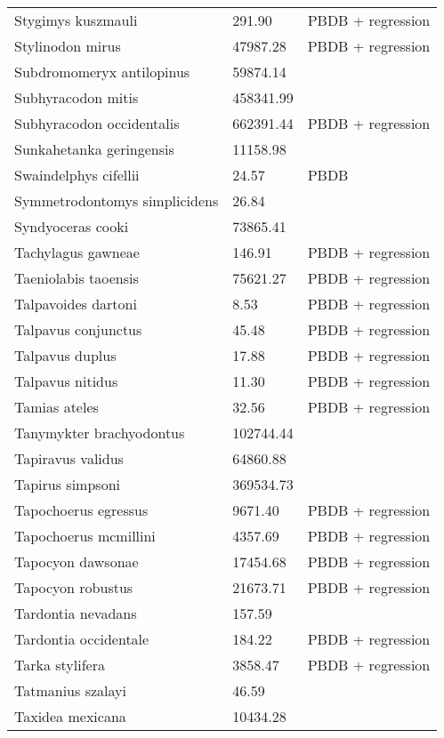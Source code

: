 \begin{center}
\begin{longtable}{p{} p{} p{} }
  Stygimys kuszmauli & 291.90 & PBDB + regression \\ 
  Stylinodon mirus & 47987.28 & PBDB + regression \\ 
  Subdromomeryx antilopinus & 59874.14 & \cite{Tomiya2013} \\ 
  Subhyracodon mitis & 458341.99 & \cite{Scott1940} \\ 
  Subhyracodon occidentalis & 662391.44 & PBDB + regression \\ 
  Sunkahetanka geringensis & 11158.98 & \cite{Tomiya2013} \\ 
  Swaindelphys cifellii & 24.57 & PBDB \\ 
  Symmetrodontomys simplicidens & 26.84 & \cite{Tomiya2013} \\ 
  Syndyoceras cooki & 73865.41 & \cite{Tomiya2013} \\ 
  Tachylagus gawneae & 146.91 & PBDB + regression \\ 
  Taeniolabis taoensis & 75621.27 & PBDB + regression \\ 
  Talpavoides dartoni & 8.53 & PBDB + regression \\ 
  Talpavus conjunctus & 45.48 & PBDB + regression \\ 
  Talpavus duplus & 17.88 & PBDB + regression \\ 
  Talpavus nitidus & 11.30 & PBDB + regression \\ 
  Tamias ateles & 32.56 & PBDB + regression \\ 
  Tanymykter brachyodontus & 102744.44 & \cite{Tomiya2013} \\ 
  Tapiravus validus & 64860.88 & \cite{Tomiya2013} \\ 
  Tapirus simpsoni & 369534.73 & \cite{Tomiya2013} \\ 
  Tapochoerus egressus & 9671.40 & PBDB + regression \\ 
  Tapochoerus mcmillini & 4357.69 & PBDB + regression \\ 
  Tapocyon dawsonae & 17454.68 & PBDB + regression \\ 
  Tapocyon robustus & 21673.71 & PBDB + regression \\ 
  Tardontia nevadans & 157.59 & \cite{Tomiya2013} \\ 
  Tardontia occidentale & 184.22 & PBDB + regression \\ 
  Tarka stylifera & 3858.47 & PBDB + regression \\ 
  Tatmanius szalayi & 46.59 & \cite{Ferrusquia-Villafranca2006} \\ 
  Taxidea mexicana & 10434.28 & \cite{Bloch2007} \\ 

\end{longtable}
\end{center}

